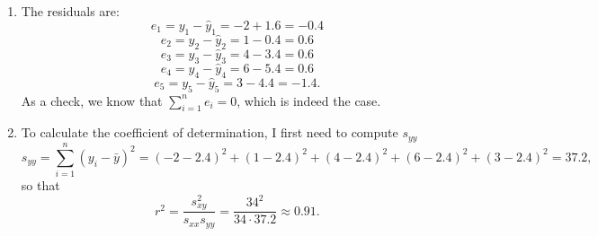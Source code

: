 \begin{problem}{21}
\begin{enumerate}
\item The residuals are:
\begin{equation*}
e_1 = y_1 - \hat y_1=-2+1.6=-0.4
\end{equation*}
\begin{equation*}
e_2 = y_2 - \hat y_2=1-0.4=0.6
\end{equation*}
\begin{equation*}
e_3 = y_3 - \hat y_3=4-3.4=0.6
\end{equation*}
\begin{equation*}
e_4 = y_4 - \hat y_4=6-5.4=0.6
\end{equation*}
\begin{equation*}
e_5 = y_5 - \hat y_5=3-4.4=-1.4.
\end{equation*}
As a check, we know that $\sum_{i=1}^n e_i =0$, which is indeed the case.

\item To calculate the coefficient of determination, I first need to compute $s_{yy}$
\begin{equation*}
s_{yy} = \sum_{i=1}^n(y_i-\bar y)^2 = (-2-2.4)^2+(1-2.4)^2+(4-2.4)^2+(6-2.4)^2+(3-2.4)^2=37.2,
\end{equation*}
so that
\begin{equation*}
r^2 = \frac{s_{xy}^2}{s_{xx}s_{yy}}  = \frac{34^2}{34\cdot37.2} \approx 0.91.
\end{equation*}

\end{enumerate}

\end{problem}

